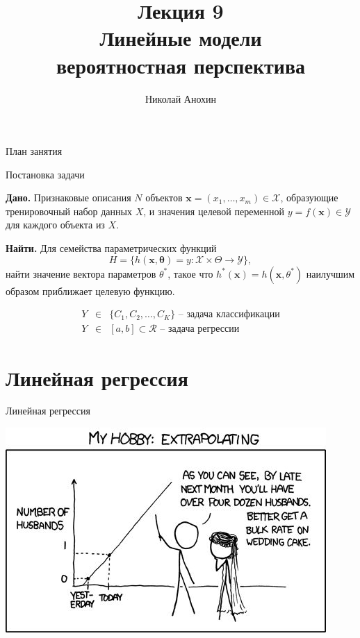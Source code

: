 \documentclass[aspectratio=169]{beamer}
\author{Николай Анохин}
\title{\newline \newline \newline Лекция 9 \\ Линейные модели \\ вероятностная перспектива}
\let\otp\titlepage
\renewcommand{\titlepage}{\otp\addtocounter{framenumber}{-1}}
\begin{document}
\begin{frame}[plain]
\titlepage
\end{frame}

\begin{frame}{План занятия}
\tableofcontents
\end{frame}

\begin{frame}{Постановка задачи}

{\bf Дано.} Признаковые описания $N$ объектов $\mathbf{x} = (x_1, \ldots, x_m) \in \mathcal{X}$, образующие тренировочный набор данных $X$, и значения целевой переменной $y = f(\mathbf{x}) \in \mathcal{Y}$ для каждого объекта из $X$. 

\vspace{1em}
{\bf Найти.} Для семейства параметрических функций 
\[
H = \{h(\mathbf{x, \mathbf{\theta}}) = y: \mathcal{X} \times \Theta \rightarrow \mathcal{Y}\},
\]
найти значение вектора параметров $\theta^*$, такое что $h^*(\mathbf{x}) = h(\mathbf{x}, \theta^*)$ наилучшим образом приближает целевую функцию.

\begin{eqnarray*}
Y & \in & \{C_1, C_2, \ldots, C_K\} \text{ -- задача классификации}  \\
Y & \in & [a, b] \subset \mathcal{R} \text{ -- задача регрессии}
\end{eqnarray*}

\end{frame}


\section{Линейная регрессия}


\begin{frame}{}

\begin{center}
\Large Линейная регрессия

\vspace{1em}
\includegraphics[height=0.7\textheight]{images/lr_joke.jpg}
\end{center}

\end{frame}
\end{document}
